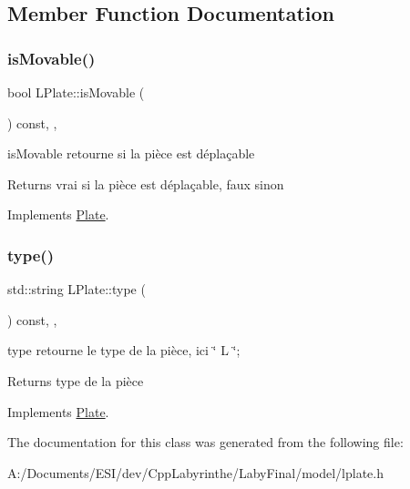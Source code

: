 \subsection{Member Function Documentation}
\mbox{\label{class_l_plate_ade5e8a7ead0c0eae0cbdb2a15aa6f32a}} 
\subsubsection{\texorpdfstring{isMovable()}{isMovable()}}
{\footnotesize\ttfamily bool L\+Plate\+::is\+Movable (\begin{DoxyParamCaption}{ }\end{DoxyParamCaption}) const\hspace{0.3cm}{\ttfamily [inline]}, {\ttfamily [override]}, {\ttfamily [virtual]}}



is\+Movable retourne si la pièce est déplaçable 

\begin{DoxyReturn}{Returns}
vrai si la pièce est déplaçable, faux sinon 
\end{DoxyReturn}


Implements \mbox{\hyperlink{class_plate}{Plate}}.

\mbox{\label{class_l_plate_a2714a969bb1eb66592a685b7f9f4de99}} 
\subsubsection{\texorpdfstring{type()}{type()}}
{\footnotesize\ttfamily std\+::string L\+Plate\+::type (\begin{DoxyParamCaption}{ }\end{DoxyParamCaption}) const\hspace{0.3cm}{\ttfamily [inline]}, {\ttfamily [override]}, {\ttfamily [virtual]}}



type retourne le type de la pièce, ici \char`\"{} L \char`\"{}; 

\begin{DoxyReturn}{Returns}
type de la pièce 
\end{DoxyReturn}


Implements \mbox{\hyperlink{class_plate}{Plate}}.



The documentation for this class was generated from the following file\+:\begin{DoxyCompactItemize}
\item 
A\+:/\+Documents/\+E\+S\+I/dev/\+Cpp\+Labyrinthe/\+Laby\+Final/model/lplate.\+h\end{DoxyCompactItemize}
